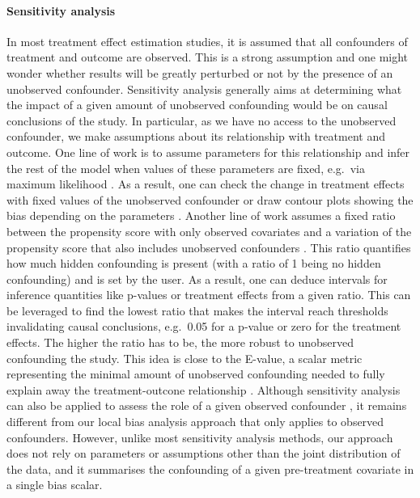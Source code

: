  


\paragraph{Sensitivity analysis}

In most treatment effect estimation studies, it is assumed that all confounders of treatment and outcome are observed. This is a strong assumption and one might wonder whether results will be greatly perturbed or not by the presence of an unobserved confounder. Sensitivity analysis generally aims at determining what the impact of a given amount of unobserved confounding would be on causal conclusions of the study. In particular, as we have no access to the unobserved confounder, we make assumptions about its relationship with treatment and outcome. One line of work is to assume parameters for this relationship and infer the rest of the model when values of these parameters are fixed, e.g.~via maximum likelihood . As a result, one can check the change in treatment effects with fixed values of the unobserved confounder  or draw contour plots showing the bias depending on the parameters . Another line of work assumes a fixed ratio between the propensity score with only observed covariates and a variation of the propensity score that also includes unobserved confounders . This ratio quantifies how much hidden confounding is present (with a ratio of 1 being no hidden confounding) and is set by the user. As a result, one can deduce intervals for inference quantities like p-values or treatment effects from a given ratio. This can be leveraged to find the lowest ratio that makes the interval reach thresholds invalidating causal conclusions, e.g.~0.05 for a p-value or zero for the treatment effects. The higher the ratio has to be, the more robust to unobserved confounding the study. This idea is close to the E-value, a scalar metric representing the minimal amount of unobserved confounding needed to fully explain away the treatment-outcone relationship . Although sensitivity analysis can also be applied to assess the role of a given observed confounder , it remains different from our local bias analysis approach that only applies to observed confounders. However, unlike most sensitivity analysis methods, our approach does not rely on parameters or assumptions other than the joint distribution of the data, and it summarises the confounding of a given pre-treatment covariate in a single bias scalar.

